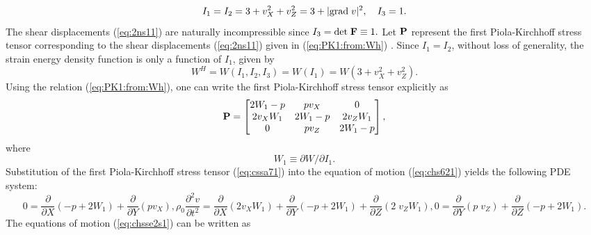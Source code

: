 \documentclass[11pt,letter,subeqn,fleqn]{article}
\DeclarePairedDelimiter{\abs}{\lvert}{\rvert}
\numberwithin{equation}{section}
\numberwithin{table}{section}
\numberwithin{figure}{section}
\def\beq{\begin{equation}}
\def\eeq{\end{equation}}
\def\vec#1{{\boldsymbol{\rm #1}}} %
\def\vec#1{{\boldsymbol{\rm #1}}} %
\begin{document}
\begin{equation*}\label{eq:PrinInv}
	I_{1}=I_{2}=3+v^{2}_{X}+v^{2}_{Z}=3+\abs{\mathrm{grad}\;v}^{2}, \quad I_{3}=1.
\end{equation*}
The shear displacements (\ref{eq:2ns11}) are naturally incompressible since $\displaystyle I_{3}=\mathrm{det}\; \vec{F}\equiv 1.$ Let $\vec{P}$ represent the first Piola-Kirchhoff stress tensor corresponding to the shear displacements (\ref{eq:2ns11}) given in (\ref{eq:PK1:from:Wh}) \cite{ciarlet1987mathematical}. Since $I_{1}=I_{2}$, without loss of generality, the strain energy density function is only a function of $I_{1}$, given by
\begin{equation}\label{eq:NeqSED}
W^{H}=W(I_{1},I_{2},I_{3})=W(I_{1})=W(3+v^{2}_{X}+v^{2}_{Z}).
\end{equation}
Using the relation (\ref{eq:PK1:from:Wh}), one can write the first Piola-Kirchhoff stress tensor explicitly as
\begin{equation}\label{eq:cssa71}
\vec{P}
=
\begin{bmatrix}
2W_{1}-p &pv_{X} & 0 \\
2v_{X}W_{1} &2W_{1}-p & 2v_{Z}W_{1}\\
0 &pv_{Z} &2W_{1}-p
\end{bmatrix},
\end{equation}
where
\beq
\displaystyle W_{1}\equiv \partial W/\partial I_{1}.
\eeq
 Substitution of the first Piola-Kirchhoff stress tensor (\ref{eq:cssa71}) into the equation of motion (\ref{eq:chs621}) yields the following PDE system:
\begin{subequations}\label{eq:chsse2s1}
	\begin{equation}\label{eq:2ss111}
	0=\frac{\partial }{\partial X}\left(-p+2W_{1}\right)+\frac{\partial }{\partial Y}\left(pv_{X}\right),
	\end{equation}
	\begin{equation}\label{eq:2ss121}
	\rho_0\frac{\partial^2 v}{\partial t^{2}}=\frac{\partial}{\partial X}\left(2 v_{X}W_{1}\right)+\frac{\partial}{\partial Y}\left(-p+2W_{1}\right)+\frac{\partial}{\partial Z}\left(2 \;v_{Z}W_{1}\right),
	\end{equation}
	\begin{equation}\label{eq:2ss131}
	0=\frac{\partial}{\partial Y}\left(p \;v_{Z}\right)+\frac{\partial}{\partial Z}\left(-p+2W_{1}\right).
	\end{equation}
\end{subequations}
The equations of motion (\ref{eq:chsse2s1}) can be written as
\end{document}
